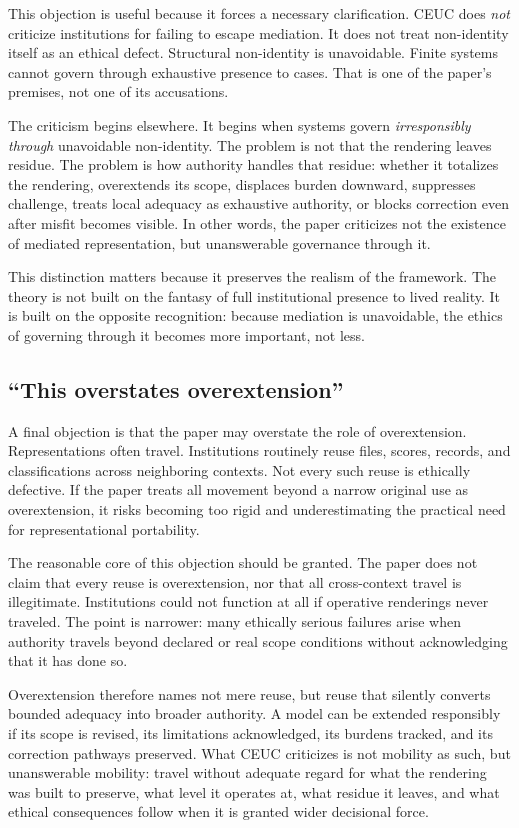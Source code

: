 \documentclass[11pt]{article}
\renewcommand{\emph}[1]{\textit{#1}}
\begin{document}
This objection is useful because it forces a necessary clarification. CEUC does \emph{not} criticize institutions for failing to escape mediation. It does not treat non-identity itself as an ethical defect. Structural non-identity is unavoidable. Finite systems cannot govern through exhaustive presence to cases. That is one of the paper's premises, not one of its accusations.

The criticism begins elsewhere. It begins when systems govern \emph{irresponsibly through} unavoidable non-identity. The problem is not that the rendering leaves residue. The problem is how authority handles that residue: whether it totalizes the rendering, overextends its scope, displaces burden downward, suppresses challenge, treats local adequacy as exhaustive authority, or blocks correction even after misfit becomes visible. In other words, the paper criticizes not the existence of mediated representation, but unanswerable governance through it.

This distinction matters because it preserves the realism of the framework. The theory is not built on the fantasy of full institutional presence to lived reality. It is built on the opposite recognition: because mediation is unavoidable, the ethics of governing through it becomes more important, not less.

\subsection{``This overstates overextension''}

A final objection is that the paper may overstate the role of overextension. Representations often travel. Institutions routinely reuse files, scores, records, and classifications across neighboring contexts. Not every such reuse is ethically defective. If the paper treats all movement beyond a narrow original use as overextension, it risks becoming too rigid and underestimating the practical need for representational portability.

The reasonable core of this objection should be granted. The paper does not claim that every reuse is overextension, nor that all cross-context travel is illegitimate. Institutions could not function at all if operative renderings never traveled. The point is narrower: many ethically serious failures arise when authority travels beyond declared or real scope conditions without acknowledging that it has done so.

Overextension therefore names not mere reuse, but reuse that silently converts bounded adequacy into broader authority. A model can be extended responsibly if its scope is revised, its limitations acknowledged, its burdens tracked, and its correction pathways preserved. What CEUC criticizes is not mobility as such, but unanswerable mobility: travel without adequate regard for what the rendering was built to preserve, what level it operates at, what residue it leaves, and what ethical consequences follow when it is granted wider decisional force.
\end{document}
